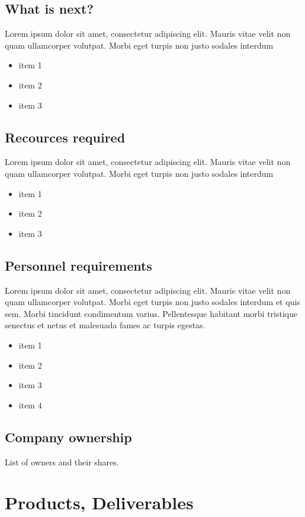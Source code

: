 \documentclass[11pt,titlepage]{article}
\begin{document}
\subsection{What is next?}
Lorem ipsum dolor sit amet, consectetur adipiscing elit. Mauris vitae velit 
non quam ullamcorper volutpat. Morbi eget turpis non justo sodales interdum
\newline
\begin{itemize}
\item item 1
\item item 2
\item item 3
\end{itemize}
 
\subsection{Recources required}
Lorem ipsum dolor sit amet, consectetur adipiscing elit. Mauris vitae velit 
non quam ullamcorper volutpat. Morbi eget turpis non justo sodales interdum
\newline
\begin{itemize}
\item item 1
\item item 2
\item item 3
\end{itemize}

\subsection{Personnel requirements}
Lorem ipsum dolor sit amet, consectetur adipiscing elit. Mauris vitae velit 
non quam ullamcorper volutpat. Morbi eget turpis non justo sodales interdum 
et quis sem. Morbi tincidunt condimentum varius. Pellentesque habitant morbi 
tristique senectus et netus et malesuada fames ac turpis egestas.\newline
\begin{itemize}
\item item 1
\item item 2
\item item 3
\item item 4
\end{itemize}

\subsection{Company ownership}
List of owners and their shares.
\pagebreak


\section{Products, Deliverables}
\end{document}
